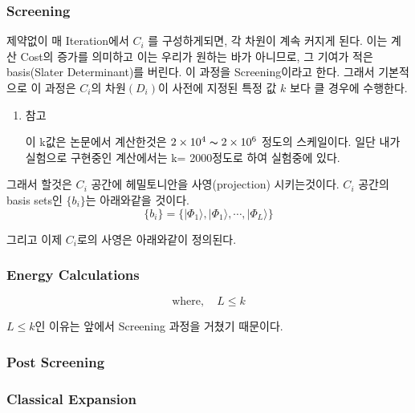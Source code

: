 \documentclass[10pt]{article}
\begin{document}
\subsubsection{Screening}
제약없이 매 Iteration에서 \(C_i\) 를 구성하게되면, 각 차원이 계속 커지게 된다. 이는 계산 Cost의 증가를 의미하고 이는 우리가 원하는 바가 아니므로, 그 기여가 적은 basis(Slater Determinant)를 버린다. 이 과정을 Screening이라고 한다. 
그래서 기본적으로 이 과정은 \(C_i\)의 차원\(\left(D_{i}\right)\)이 사전에 지정된 특정 값 \(k\) 보다 클 경우에 수행한다. 
\begin{enumerate}[label=\(\ast\)]
\item {참고}

이 k값은 논문에서 계산한것은 \(2 \times 10^{4} \thicksim  2 \times 10^{6}\) 정도의 스케일이다. 일단 내가 실험으로 구현중인 계산에서는 k= 2000정도로 하여 실험중에 있다. 
\end{enumerate}
그래서 할것은 \(C_i\) 공간에 헤밀토니안을 사영(projection) 시키는것이다. 
\(C_i\) 공간의 basis sets인 \(\{b_i\}\)는 아래와같을 것이다. 
\[
\{b_i\} = \{\vert \Phi_1 \rangle, \vert \Phi_1 \rangle, \cdots, \vert \Phi_{L} \rangle \}
\]

그리고 이제 \(C_i\)로의 사영은 아래와같이 정의된다. 



\subsubsection{Energy Calculations}
\[
\text{where}, \quad L \leq k
\]

\(L \leq k\)인 이유는 앞에서 Screening 과정을 거쳤기 때문이다. 

\subsubsection{Post Screening}
\subsubsection{Classical Expansion}
\end{document}
